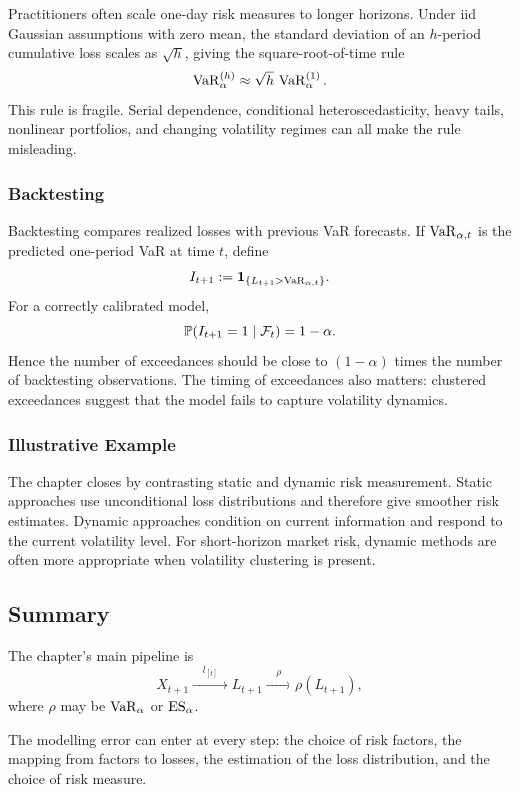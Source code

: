 Practitioners often scale one-day risk measures to longer horizons. Under iid Gaussian assumptions with zero mean, the standard deviation of an $h$-period cumulative loss scales as $\sqrt{h}$, giving the square-root-of-time rule
\[
    \operatorname{VaR}_\alpha^{(h)}\approx \sqrt{h}\,\operatorname{VaR}_\alpha^{(1)}.
\]
This rule is fragile. Serial dependence, conditional heteroscedasticity, heavy tails, nonlinear portfolios, and changing volatility regimes can all make the rule misleading.

\subsubsection{Backtesting}

Backtesting compares realized losses with previous VaR forecasts. If $\operatorname{VaR}_{\alpha,t}$ is the predicted one-period VaR at time $t$, define
\[
    I_{t+1}:=\mathbf{1}_{\{L_{t+1}>\operatorname{VaR}_{\alpha,t}\}}.
\]
For a correctly calibrated model,
\[
    \mathbb{P}(I_{t+1}=1\mid\mathcal{F}_t)=1-\alpha.
\]
Hence the number of exceedances should be close to $(1-\alpha)$ times the number of backtesting observations. The timing of exceedances also matters: clustered exceedances suggest that the model fails to capture volatility dynamics.

\subsubsection{Illustrative Example}

The chapter closes by contrasting static and dynamic risk measurement. Static approaches use unconditional loss distributions and therefore give smoother risk estimates. Dynamic approaches condition on current information and respond to the current volatility level. For short-horizon market risk, dynamic methods are often more appropriate when volatility clustering is present.

\subsection{Summary}

The chapter's main pipeline is
\[
    X_{t+1}
    \xrightarrow{\quad l_{[t]}\quad}
    L_{t+1}
    \xrightarrow{\quad \rho\quad}
    \rho(L_{t+1}),
\]
where $\rho$ may be $\operatorname{VaR}_\alpha$ or $\operatorname{ES}_\alpha$.

The modelling error can enter at every step: the choice of risk factors, the mapping from factors to losses, the estimation of the loss distribution, and the choice of risk measure.
